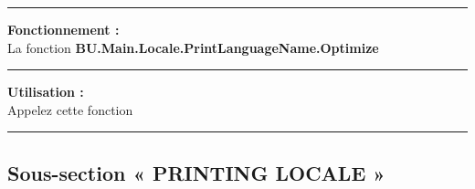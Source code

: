 \documentclass[a4paper,10pt]{article}
\begin{document}

    \par\noindent\rule{\textwidth}{0.4pt}

    \begin{justify}
        \textbf{Fonctionnement :}\\[1\baselineskip]
        La fonction \textbf{\color{func}BU.Main.Locale.PrintLanguageName.Optimize}
    \end{justify}


    \par\noindent\rule{\textwidth}{0.4pt}

    \begin{justify}
        \textbf{Utilisation :}\\[1\baselineskip]
        Appelez cette fonction
    \end{justify}




    \color{sec2}\par\noindent\rule{\textwidth}{0.4pt}\color{text}\setlength{\parskip}{1em}

    \color{sec2}
    \subsection{Sous-section « PRINTING LOCALE »}\color{text}




\end{document}
